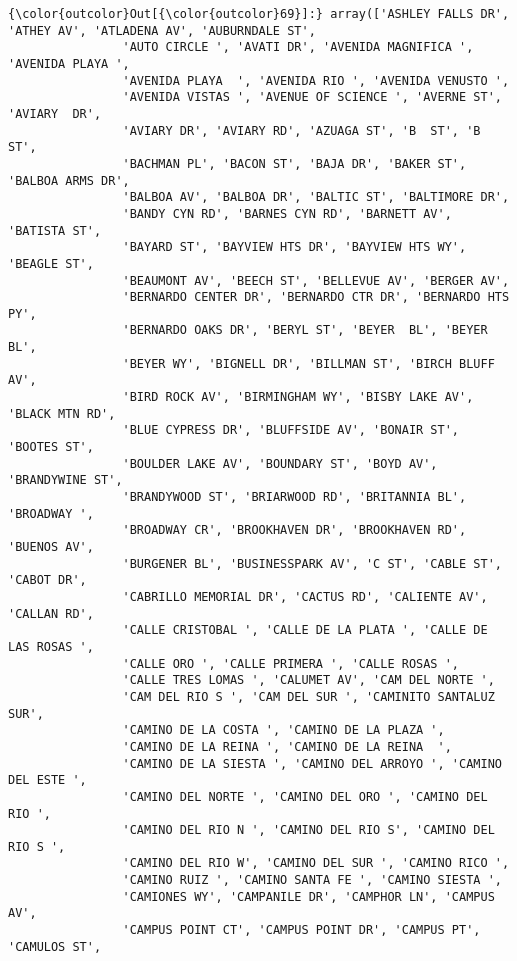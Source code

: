\documentclass[11pt]{article}
\begin{document}
\begin{Verbatim}[commandchars=\\\{\}]
{\color{outcolor}Out[{\color{outcolor}69}]:} array(['ASHLEY FALLS DR', 'ATHEY AV', 'ATLADENA AV', 'AUBURNDALE ST',
                'AUTO CIRCLE ', 'AVATI DR', 'AVENIDA MAGNIFICA ', 'AVENIDA PLAYA ',
                'AVENIDA PLAYA  ', 'AVENIDA RIO ', 'AVENIDA VENUSTO ',
                'AVENIDA VISTAS ', 'AVENUE OF SCIENCE ', 'AVERNE ST', 'AVIARY  DR',
                'AVIARY DR', 'AVIARY RD', 'AZUAGA ST', 'B  ST', 'B ST',
                'BACHMAN PL', 'BACON ST', 'BAJA DR', 'BAKER ST', 'BALBOA ARMS DR',
                'BALBOA AV', 'BALBOA DR', 'BALTIC ST', 'BALTIMORE DR',
                'BANDY CYN RD', 'BARNES CYN RD', 'BARNETT AV', 'BATISTA ST',
                'BAYARD ST', 'BAYVIEW HTS DR', 'BAYVIEW HTS WY', 'BEAGLE ST',
                'BEAUMONT AV', 'BEECH ST', 'BELLEVUE AV', 'BERGER AV',
                'BERNARDO CENTER DR', 'BERNARDO CTR DR', 'BERNARDO HTS PY',
                'BERNARDO OAKS DR', 'BERYL ST', 'BEYER  BL', 'BEYER BL',
                'BEYER WY', 'BIGNELL DR', 'BILLMAN ST', 'BIRCH BLUFF AV',
                'BIRD ROCK AV', 'BIRMINGHAM WY', 'BISBY LAKE AV', 'BLACK MTN RD',
                'BLUE CYPRESS DR', 'BLUFFSIDE AV', 'BONAIR ST', 'BOOTES ST',
                'BOULDER LAKE AV', 'BOUNDARY ST', 'BOYD AV', 'BRANDYWINE ST',
                'BRANDYWOOD ST', 'BRIARWOOD RD', 'BRITANNIA BL', 'BROADWAY ',
                'BROADWAY CR', 'BROOKHAVEN DR', 'BROOKHAVEN RD', 'BUENOS AV',
                'BURGENER BL', 'BUSINESSPARK AV', 'C ST', 'CABLE ST', 'CABOT DR',
                'CABRILLO MEMORIAL DR', 'CACTUS RD', 'CALIENTE AV', 'CALLAN RD',
                'CALLE CRISTOBAL ', 'CALLE DE LA PLATA ', 'CALLE DE LAS ROSAS ',
                'CALLE ORO ', 'CALLE PRIMERA ', 'CALLE ROSAS ',
                'CALLE TRES LOMAS ', 'CALUMET AV', 'CAM DEL NORTE ',
                'CAM DEL RIO S ', 'CAM DEL SUR ', 'CAMINITO SANTALUZ SUR',
                'CAMINO DE LA COSTA ', 'CAMINO DE LA PLAZA ',
                'CAMINO DE LA REINA ', 'CAMINO DE LA REINA  ',
                'CAMINO DE LA SIESTA ', 'CAMINO DEL ARROYO ', 'CAMINO DEL ESTE ',
                'CAMINO DEL NORTE ', 'CAMINO DEL ORO ', 'CAMINO DEL RIO ',
                'CAMINO DEL RIO N ', 'CAMINO DEL RIO S', 'CAMINO DEL RIO S ',
                'CAMINO DEL RIO W', 'CAMINO DEL SUR ', 'CAMINO RICO ',
                'CAMINO RUIZ ', 'CAMINO SANTA FE ', 'CAMINO SIESTA ',
                'CAMIONES WY', 'CAMPANILE DR', 'CAMPHOR LN', 'CAMPUS AV',
                'CAMPUS POINT CT', 'CAMPUS POINT DR', 'CAMPUS PT', 'CAMULOS ST',

\end{Verbatim}
\end{document}
